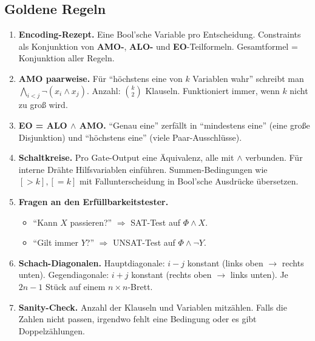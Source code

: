 \documentclass[a4paper,12pt]{article}
\begin{document}
\subsection*{Goldene Regeln}

\begin{merkbox}[title={Goldene Regeln zum Mitnehmen}]
\begin{enumerate}
\item \textbf{Encoding-Rezept.} Eine Bool'sche Variable pro
      Entscheidung. Constraints als Konjunktion von
      \textbf{AMO-}, \textbf{ALO-} und \textbf{EO}-Teilformeln.
      Gesamtformel = Konjunktion aller Regeln.

\item \textbf{AMO paarweise.} F\"ur "`h\"ochstens eine von $k$
      Variablen wahr"' schreibt man
      $\bigwedge_{i<j} \neg(x_i \wedge x_j)$. Anzahl: $\binom{k}{2}$
      Klauseln. Funktioniert immer, wenn $k$ nicht zu gro{\ss} wird.

\item \textbf{EO = ALO $\wedge$ AMO.} "`Genau eine"' zerf\"allt in
      "`mindestens eine"' (eine gro{\ss}e Disjunktion) und "`h\"ochstens
      eine"' (viele Paar-Ausschl\"usse).

\item \textbf{Schaltkreise.} Pro Gate-Output eine \"Aquivalenz, alle
      mit $\wedge$ verbunden. F\"ur interne Dr\"ahte Hilfsvariablen
      einf\"uhren. Summen-Bedingungen wie $[>k], [=k]$ mit
      Fallunterscheidung in Bool'sche Ausdr\"ucke \"ubersetzen.

\item \textbf{Fragen an den Erf\"ullbarkeitstester.}
      \begin{itemize}[nosep]
      \item "`Kann $X$ passieren?"' $\Rightarrow$ SAT-Test auf
            $\Phi \wedge X$.
      \item "`Gilt immer $Y$?"' $\Rightarrow$ UNSAT-Test auf
            $\Phi \wedge \neg Y$.
      \end{itemize}

\item \textbf{Schach-Diagonalen.} Hauptdiagonale: $i - j$ konstant
      (links oben $\to$ rechts unten). Gegendiagonale: $i + j$
      konstant (rechts oben $\to$ links unten). Je $2n - 1$ St\"uck
      auf einem $n \times n$-Brett.

\item \textbf{Sanity-Check.} Anzahl der Klauseln und Variablen
      mitz\"ahlen. Falls die Zahlen nicht passen, irgendwo fehlt eine
      Bedingung oder es gibt Doppelz\"ahlungen.
\end{enumerate}
\end{merkbox}
\end{document}
